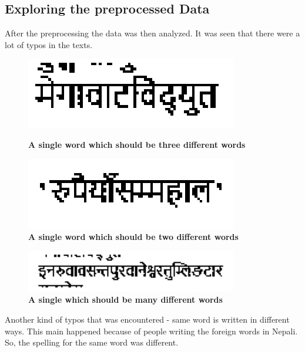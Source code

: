 \documentclass[12pt]{report}
\begin{document}
            \subsection{Exploring the preprocessed Data}
            After the preprocessing the data was then analyzed. It was seen that there were a lot of typos in the texts. 
            \begin{figure}[!htb]
                \begin{minipage}{0.48\textwidth}
                  \centering
                  \includegraphics[width=.7\linewidth]{typo11.png}
                  \caption{\textbf{A single word which should be three different words}}\label{Fig:typo1}
                \end{minipage}\hfill
                \begin{minipage}{0.48\textwidth}
                  \centering
                  \includegraphics[width=.7\linewidth]{typo22.png}
                  \caption{\textbf{A single word which should be two different words}}\label{Fig:typo2}
                \end{minipage}
             \end{figure}

             \begin{figure}[h]
                 \centering
                 \includegraphics[width=.7\linewidth]{typo33.png}
                 \caption{\textbf{A single which should be many different words}}\label{Fig:typo3}
             \end{figure}

            Another kind of typos that was encountered - same word is written in different ways. This main happened 
            because of people writing the foreign words in Nepali. So, the spelling for the same word was different.
            
\end{document}
